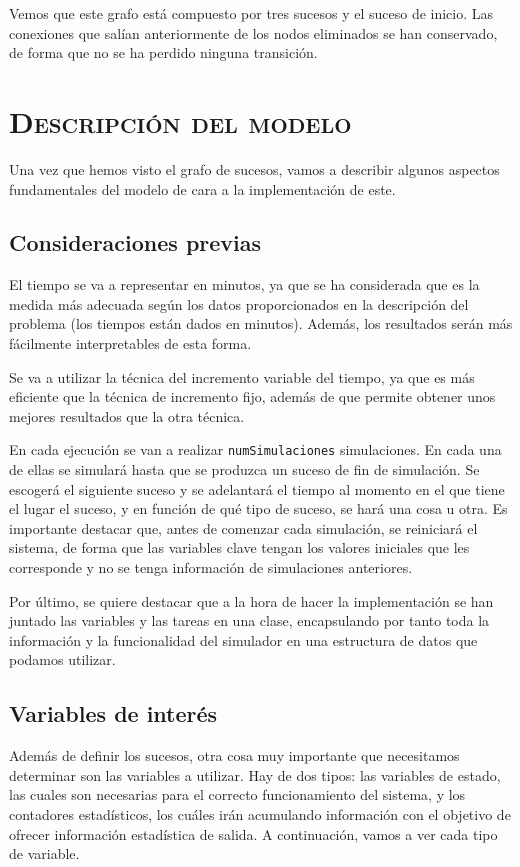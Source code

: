 \documentclass[11pt,a4paper]{article}
\begin{document}
Vemos que este grafo está compuesto por tres sucesos y el suceso de inicio. Las conexiones
que salían anteriormente de los nodos eliminados se han conservado, de forma que no se
ha perdido ninguna transición.

\section{\textsc{Descripción del modelo}}

Una vez que hemos visto el grafo de sucesos, vamos a describir algunos aspectos
fundamentales del modelo de cara a la implementación de este.

\subsection{Consideraciones previas}

El tiempo se va a representar en minutos, ya que se ha considerada que es la medida
más adecuada según los datos proporcionados en la descripción del problema (los tiempos
están dados en minutos). Además, los resultados serán más fácilmente interpretables de
esta forma.

Se va a utilizar la técnica del incremento variable del tiempo, ya que es más eficiente
que la técnica de incremento fijo, además de que permite obtener unos mejores resultados
que la otra técnica.

En cada ejecución se van a realizar \texttt{numSimulaciones} simulaciones. En cada una
de ellas se simulará hasta que se produzca un suceso de fin de simulación. Se escogerá
el siguiente suceso y se adelantará el tiempo al momento en el que tiene el lugar el suceso,
y en función de qué tipo de suceso, se hará una cosa u otra. Es importante destacar que, antes
de comenzar cada simulación, se reiniciará el sistema, de forma que las variables clave
tengan los valores iniciales que les corresponde y no se tenga información de simulaciones
anteriores.

Por último, se quiere destacar que a la hora de hacer la implementación se han juntado las variables
y las tareas en una clase, encapsulando por tanto toda la información y la funcionalidad del
simulador en una estructura de datos que podamos utilizar.

\subsection{Variables de interés}

Además de definir los sucesos, otra cosa muy importante que necesitamos determinar son las variables
a utilizar. Hay de dos tipos: las variables de estado, las cuales son necesarias para el correcto funcionamiento
del sistema, y los contadores estadísticos, los cuáles irán acumulando información con el objetivo
de ofrecer información estadística de salida. A continuación, vamos a ver cada tipo de variable.
\end{document}
